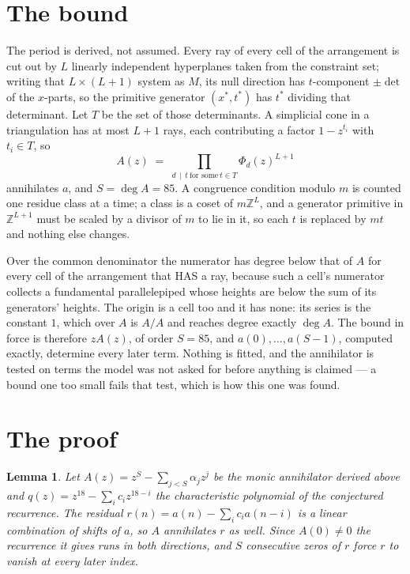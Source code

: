 \documentclass[11pt,a4paper]{article}
\theoremstyle{plain}
\newtheorem{lemma}[theorem]{Lemma}
\theoremstyle{definition}
\begin{document}
\section{The bound}

The period is derived, not assumed. Every ray of every cell of the arrangement is cut out by
$L$ linearly independent hyperplanes taken from the constraint set; writing that $L\times(L+1)$
system as $M$, its null direction has $t$-component $\pm\det$ of the $x$-parts, so the
primitive generator $(x^*,t^*)$ has $t^*$ dividing that determinant. Let $T$ be the set of
those determinants. A simplicial cone in a triangulation has at most $L+1$ rays, each
contributing a factor $1-z^{t_i}$ with $t_i\in T$, so
\[
A(z)\;=\;\prod_{d\,\mid\,t\ \text{for some}\ t\in T}\Phi_d(z)^{L+1}
\]
annihilates $a$, and $S=\deg A=85$. A congruence condition modulo $m$ is counted one residue
class at a time; a class is a coset of $m\mathbb{Z}^L$, and a generator primitive in
$\mathbb{Z}^{L+1}$ must be scaled by a divisor of $m$ to lie in it, so each $t$ is replaced
by $mt$ and nothing else changes.

Over the common denominator the numerator has degree below that of $A$ for every cell of the
arrangement that HAS a ray, because such a cell's numerator collects a fundamental
parallelepiped whose heights are below the sum of its generators' heights. The origin is a cell
too and it has none: its series is the constant $1$, which over $A$ is $A/A$ and reaches degree
exactly $\deg A$. The bound in force is therefore $zA(z)$, of order $S=85$, and
$a(0),\dots,a(S-1)$, computed exactly, determine every later term. Nothing is fitted, and the
annihilator is tested on terms the model was not asked for before anything is claimed --- a
bound one too small fails that test, which is how this one was found.

\section{The proof}

\begin{lemma}\label{lem:crit}
Let $A(z)=z^S-\sum_{j<S}\alpha_jz^{j}$ be the monic annihilator derived above and
$q(z)=z^{18}-\sum_ic_iz^{18-i}$ the characteristic polynomial of the conjectured
recurrence. The residual $r(n)=a(n)-\sum_ic_ia(n-i)$ is a linear combination of shifts of $a$,
so $A$ annihilates $r$ as well. Since $A(0)\ne0$ the recurrence it gives runs in both
directions, and $S$ consecutive zeros of $r$ force $r$ to vanish at every later index.
\end{lemma}
\end{document}
